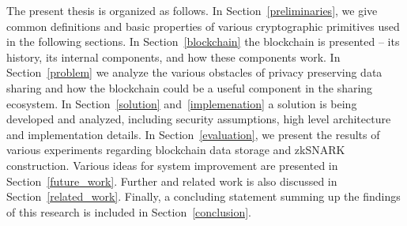 The present thesis is organized as follows. In Section~\ref{preliminaries}, we give common definitions and basic properties of various cryptographic primitives used in the following sections. In Section~\ref{blockchain} the blockchain is presented -- its history, its internal components, and how these components work. In Section~\ref{problem} we analyze the various obstacles of privacy preserving data sharing and how the blockchain could be a useful component in the sharing ecosystem. In Section~\ref{solution} and~\ref{implemenation} a solution is being developed and analyzed, including security assumptions, high level architecture and implementation details. In Section~\ref{evaluation}, we present the results of various experiments regarding blockchain data storage and zkSNARK construction. Various ideas for system improvement are presented in Section~\ref{future_work}. Further and related work is also discussed in Section~\ref{related_work}. Finally, a concluding statement summing up the findings of this research is included in Section~\ref{conclusion}.
